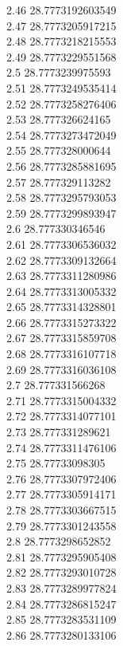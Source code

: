 {2.46	28.7773192603549\\
2.47	28.7773205917215\\
2.48	28.7773218215553\\
2.49	28.7773229551568\\
2.5	28.7773239975593\\
2.51	28.7773249535414\\
2.52	28.7773258276406\\
2.53	28.777326624165\\
2.54	28.7773273472049\\
2.55	28.777328000644\\
2.56	28.7773285881695\\
2.57	28.777329113282\\
2.58	28.7773295793053\\
2.59	28.7773299893947\\
2.6	28.777330346546\\
2.61	28.7773306536032\\
2.62	28.7773309132664\\
2.63	28.7773311280986\\
2.64	28.7773313005332\\
2.65	28.7773314328801\\
2.66	28.7773315273322\\
2.67	28.7773315859708\\
2.68	28.7773316107718\\
2.69	28.7773316036108\\
2.7	28.777331566268\\
2.71	28.7773315004332\\
2.72	28.7773314077101\\
2.73	28.777331289621\\
2.74	28.7773311476106\\
2.75	28.77733098305\\
2.76	28.7773307972406\\
2.77	28.7773305914171\\
2.78	28.7773303667515\\
2.79	28.7773301243558\\
2.8	28.7773298652852\\
2.81	28.7773295905408\\
2.82	28.7773293010728\\
2.83	28.7773289977824\\
2.84	28.7773286815247\\
2.85	28.7773283531109\\
2.86	28.7773280133106\\
}
